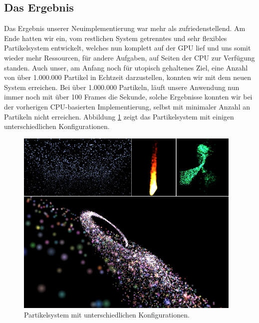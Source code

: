 \begin{Spacing}{\mylinespace}
\newpage
\subsection{Das Ergebnis}

Das Ergebnis unserer Neuimplementierung war mehr als zufriedenstellend. Am Ende hatten wir ein, vom restlichen System getrenntes und sehr flexibles Partikelsystem entwickelt, welches nun komplett auf der GPU lief und uns somit wieder mehr Ressourcen, für andere Aufgaben, auf Seiten der CPU zur Verfügung standen. Auch unser, am Anfang noch für utopisch gehaltenes Ziel, eine Anzahl von über 1.000.000 Partikel in Echtzeit darzustellen, konnten wir mit dem neuen System erreichen. Bei über 1.000.000 Partikeln, läuft unsere Anwendung nun immer noch mit über 100 Frames die Sekunde, solche Ergebnisse konnten wir bei der vorherigen CPU-basierten Implementierung, selbst mit minimaler Anzahl an Partikeln nicht erreichen. Abbildung \ref{fig:particleResults} zeigt das Partikelsystem mit einigen unterschiedlichen Konfigurationen.

\begin{figure}[h!]
	\centering
	\vspace*{30px}
	\includegraphics[width=410px]{graphics/ParticleResults.png}
	\caption{Partikelsystem mit unterschiedlichen Konfigurationen.}
	\label{fig:particleResults}
\end{figure}

\end{Spacing}
\newpage
\clearpage
